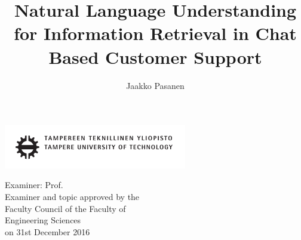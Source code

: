 \documentclass[12pt,a4paper,english
]{tutthesis}
\author{Jaakko Pasanen}
\title{Natural Language Understanding for Information Retrieval in Chat Based Customer Support} %
\begin{document}
\makeatletter

%
\thispagestyle{empty}
\vspace*{-.5cm}\noindent
\includegraphics[width=8cm]{tty_tut_logo}   %

\vspace{6.8cm}
\maketitle
\vspace{6.7cm} %

\begin{flushright}  
  \begin{minipage}[c]{6.8cm}
    \begin{spacing}{1.0}
      \textsf{Examiner: Prof. \@examiner}\\
      \textsf{Examiner and topic approved by the}\\ 
      \textsf{Faculty Council of the Faculty of}\\
      \textsf{Engineering Sciences}\\
      \textsf{on 31st December 2016}\\
    \end{spacing}
  \end{minipage}
\end{flushright}

\if@twoside
\clearpage
\fi

%
\setcounter{page}{0} %
\end{document}
